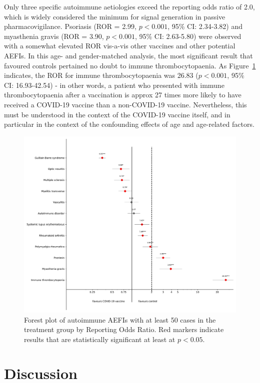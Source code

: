 \documentclass{article}
\begin{document}
Only three specific autoimmune aetiologies exceed the reporting odds ratio of 2.0, which is widely considered the minimum for signal generation in passive pharmacovigilance.
Psoriasis (ROR = 2.99, $p < 0.001$, 95\% CI: 2.34-3.82) and myasthenia gravis (ROR = 3.90, $p < 0.001$, 95\% CI: 2.63-5.80) were observed with a somewhat elevated ROR vis-a-vis other vaccines and other potential AEFIs.
In this age- and gender-matched analysis, the most significant result that favoured controls pertained no doubt to immune thrombocytopaenia.
As Figure~\ref{fig:rors} indicates, the ROR for immune thrombocytopaenia was 26.83 ($p < 0.001$, 95\% CI: 16.93-42.54) - in other words, a patient who presented with immune thrombocytopaenia after a vaccination is approx 27 times more likely to have received a COVID-19 vaccine than a non-COVID-19 vaccine.
Nevertheless, this must be understood in the context of the COVID-19 vaccine itself, and in particular in the context of the confounding effects of age and age-related factors.

\begin{figure}[H]
    \includegraphics[width=12.5 cm]{forest_plot_by_etiology}
    \caption{Forest plot of autoimmune AEFIs with at least 50 cases in the treatment group by Reporting Odds Ratio. Red markers indicate results that are statistically significant at least at $p<0.05$. \\
    \label{fig:rors}}
\end{figure}


\section{Discussion}
\end{document}
